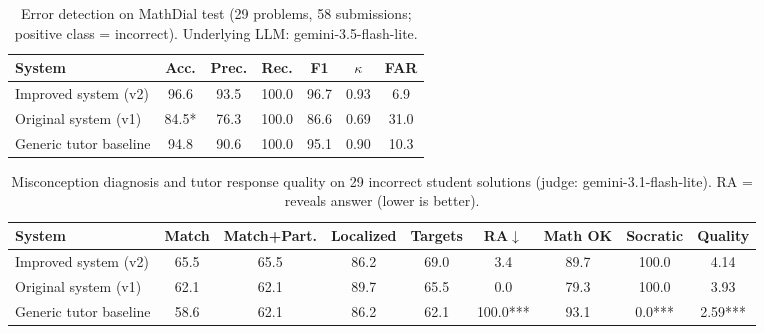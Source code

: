 \begin{table}[t]\centering\small
\caption{Error detection on MathDial test (29 problems, 58 submissions; positive class = incorrect). Underlying LLM: gemini-3.5-flash-lite.}
\begin{tabular}{lcccccc}\toprule
System & Acc. & Prec. & Rec. & F1 & $\kappa$ & FAR \\\midrule
Improved system (v2) & 96.6 & 93.5 & 100.0 & 96.7 & 0.93 & 6.9 \\
Original system (v1) & 84.5* & 76.3 & 100.0 & 86.6 & 0.69 & 31.0 \\
Generic tutor baseline & 94.8 & 90.6 & 100.0 & 95.1 & 0.90 & 10.3 \\
\bottomrule\end{tabular}\end{table}

\begin{table}[t]\centering\small
\caption{Misconception diagnosis and tutor response quality on 29 incorrect student solutions (judge: gemini-3.1-flash-lite). RA = reveals answer (lower is better).}
\begin{tabular}{lcccccccc}\toprule
System & Match & Match+Part. & Localized & Targets & RA$\downarrow$ & Math OK & Socratic & Quality \\\midrule
Improved system (v2) & 65.5 & 65.5 & 86.2 & 69.0 & 3.4 & 89.7 & 100.0 & 4.14 \\
Original system (v1) & 62.1 & 62.1 & 89.7 & 65.5 & 0.0 & 79.3 & 100.0 & 3.93 \\
Generic tutor baseline & 58.6 & 62.1 & 86.2 & 62.1 & 100.0*** & 93.1 & 0.0*** & 2.59*** \\
\bottomrule\end{tabular}\end{table}
